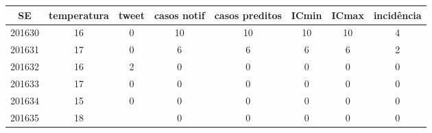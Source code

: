 \begin{tabular}{c|ccccccc}
  \hline
SE & temperatura & tweet & casos notif & casos preditos & ICmin & ICmax & incidência \\ 
  \hline
201630 & 16 & 0 & 10 & 10 & 10 & 10 & 4 \\ 
  201631 & 17 & 0 & 6 & 6 & 6 & 6 & 2 \\ 
  201632 & 16 & 2 & 0 & 0 & 0 & 0 & 0 \\ 
  201633 & 17 & 0 & 0 & 0 & 0 & 0 & 0 \\ 
  201634 & 15 & 0 & 0 & 0 & 0 & 0 & 0 \\ 
  201635 & 18 &  & 0 & 0 & 0 & 0 & 0 \\ 
   \hline
\end{tabular}
